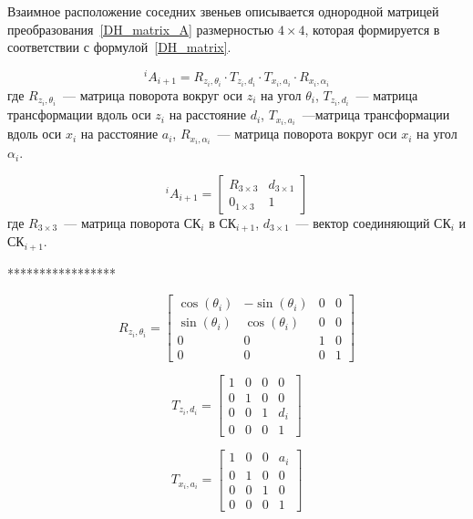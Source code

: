 Взаимное расположение соседних звеньев описывается однородной матрицей преобразования~\eqref{DH_matrix_A} размерностью $4 \times 4$, которая формируется в соответствии с формулой~\eqref{DH_matrix}.

\begin{equation}\label{DH_matrix}
^{i}A_{i+1} = R_{z_i, \theta_i} \cdot T_{z_i, d_i} \cdot T_{x_i, a_i} \cdot R_{x_i, \alpha_i}	
\end{equation}
где $R_{z_i, \theta_i}$~--- матрица поворота вокруг оси $z_i$ на угол $\theta_i$, $T_{z_i, d_i}$~--- матрица трансформации вдоль оси $z_i$ на расстояние $d_i$, $T_{x_i, a_i}$~---матрица трансформации вдоль оси $x_i$ на расстояние $a_i$,  $R_{x_i, \alpha_i}$~--- матрица поворота вокруг оси $x_i$ на угол $\alpha_i$.

\begin{equation}\label{DH_matrix_A}
^{i}A_{i+1} =
\begin{bmatrix}
R_{3 \times 3} & d_{3 \times 1}\\
0_{1 \times 3} & 1
\end{bmatrix}
\end{equation}
где $R_{3 \times 3}$~--- матрица поворота СК$_i$ в СК$_{i+1}$, $d_{3 \times 1}$~--- вектор соединяющий СК$_i$ и СК$_{i+1}$.

*****************


\begin{equation}\label{DH_matrix_Rz}
R_{z_i, \theta_i} = 
\left[\begin{matrix}
\cos{\left (\theta_i \right )} & - \sin{\left (\theta_i \right )} & 0 & 0\\
\sin{\left (\theta_i \right )} & \cos{\left (\theta_i \right )} & 0 & 0\\
0 & 0 & 1 & 0\\0 & 0 & 0 & 1
\end{matrix}\right]
\end{equation}

\begin{equation}\label{DH_matrix_Tz}
T_{z_i, d_i} =
\left[\begin{matrix}
1 & 0 & 0 & 0\\
0 & 1 & 0 & 0\\
0 & 0 & 1 & d_{i}\\
0 & 0 & 0 & 1
\end{matrix}\right]
\end{equation}

\begin{equation}\label{DH_matrix_Tx}
T_{x_i, a_i} =
\left[\begin{matrix}
1 & 0 & 0 & a_{i}\\
0 & 1 & 0 & 0\\
0 & 0 & 1 & 0\\
0 & 0 & 0 & 1
\end{matrix}\right]
\end{equation}


